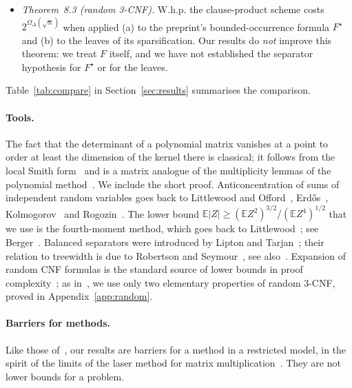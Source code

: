\documentclass[11pt,a4paper]{article}
\theoremstyle{definition}
\theoremstyle{remark}
\newcommand{\E}{\mathbb{E}}
\begin{document}
\begin{itemize}
 applies to the families of our Corollary~\ref{cor:main}. It gives $2^{\Omega(\sqrt n)}$ for
 a scheme applied to $F$ itself. This is the fair comparison for our
 $2^{\Omega(n^{2/3})}$, which holds in the product-type model only.
 Our Lemma~\ref{lem:random} adapts the proof of their Lemma~8.2 from treewidth to
 $2/3$-separators and uses the two facts of their Appendix~A.
\item \emph{Theorem~8.3 (random 3-CNF).} W.h.p. the clause-product scheme costs
 $2^{\Omega_\Delta(\sqrt n)}$ when applied (a) to the preprint's bounded-occurrence formula
 $F^\star$ and (b) to the leaves of its sparsification. Our results do \emph{not} improve
 this theorem: we treat $F$ itself, and we have not established the separator hypothesis for
 $F^\star$ or for the leaves.
\end{itemize}
Table~\ref{tab:compare} in Section~\ref{sec:results} summarises the comparison.

\paragraph{Tools.} The fact that the determinant of a polynomial matrix vanishes at a point
to order at least the dimension of the kernel there is classical; it follows from the local
Smith form~\cite{GLR82} and is a matrix analogue of the multiplicity lemmas of the polynomial
method~\cite{DKSS13}. We include the short proof. Anticoncentration of sums of independent
random variables goes back to Littlewood and Offord~\cite{LO43}, Erd\H{o}s~\cite{Erd45},
Kolmogorov~\cite{Kol58} and Rogozin~\cite{Rog61}. The lower bound
$\E|Z|\ge(\E Z^2)^{3/2}/(\E Z^4)^{1/2}$ that we use is the fourth-moment method, which goes
back to Littlewood~\cite{Lit30}; see Berger~\cite{Ber97}. Balanced separators were introduced
by Lipton and Tarjan~\cite{LT79}; their relation to treewidth is due to Robertson and
Seymour~\cite{RS86}, see also~\cite{Bod93}. Expansion of random CNF formulas is the standard
source of lower bounds in proof complexity~\cite{CS88,BSW01,BSI10}; as in~\cite{DL}, we use
only two elementary properties of random 3-CNF, proved in Appendix~\ref{app:random}.

\paragraph{Barriers for methods.} Like those of~\cite{DL}, our results are barriers for a
method in a restricted model, in the spirit of the limits of the laser method for matrix
multiplication~\cite{AFL15,AVW18}. They are not lower bounds for a problem.
\end{document}
